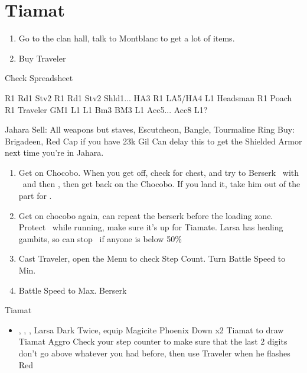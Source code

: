 \chapter{Tiamat}

\begin{enumerate}
\item Go to the clan hall, talk to Montblanc to get a lot of items.
\item Buy Traveler
\end{enumerate}
\begin{liscense}
Check Spreadsheet

			R1	Rd1	
				Stv2	
				R1	Rd1
					Stv2
Shld1... HA3					R1
LA5/HA4					
L1					Headsman
R1	Poach				R1
	Traveler				
	GM1				
L1	L1				Bm3
				BM3	L1
			Acc5... Acc8	L1?	
			\end{liscense}

\begin{shop}{Jahara}
Sell: All weapons but staves, Escutcheon, Bangle, Tourmaline Ring
Buy: Brigadeen, Red Cap if you have 23k Gil
Can delay this to get the Shielded Armor next time you're in Jahara.
\end{shop}
\begin{enumerate}
\item Get on Chocobo. When you get off, check for chest, and try to Berserk \basch\ with \penelo\ and then \vaan, then get back on the Chocobo. If you land it, take him out of the part for \balthier.
\item Get on chocobo again, can repeat the berserk before the loading zone.
\vaanf Protect \vaan\ while running, make sure it's up for Tiamate. Larsa has healing gambits, so can stop \flee\ if anyone is below 50\%
\item Cast Traveler, open the Menu to check Step Count. Turn Battle Speed to Min.
\item Battle Speed to Max. Berserk \basch
\end{enumerate}
\begin{battle}{Tiamat}
\begin{itemize}
\item \vaan, \balthier, \basch, Larsa
\vaanf Dark Twice, equip Magicite
\vaanf Phoenix Down x2 Tiamat to draw Tiamat Aggro
\balthierf Check your step counter to make sure that the last 2 digits don't go above whatever you had before, then use Traveler when he flashes Red
\end{itemize}
\end{battle}
